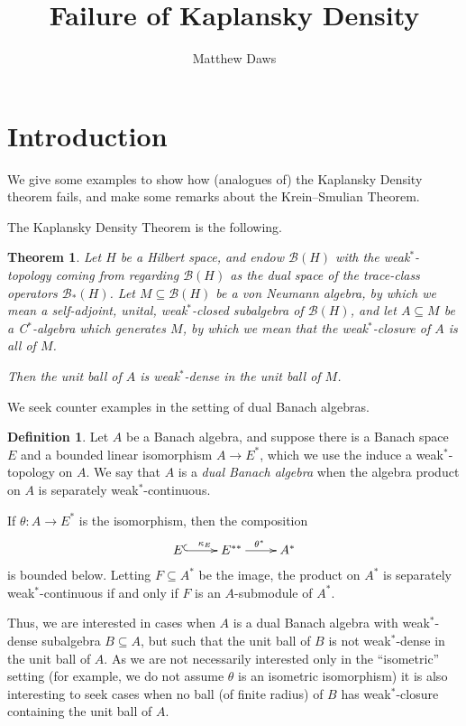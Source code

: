 \documentclass[a4paper,12pt]{article}
\theoremstyle{plain}
\newtheorem{theorem}[proposition]{Theorem}
\theoremstyle{definition}
\newtheorem{definition}[proposition]{Definition}
\newcommand{\mc}{\mathcal}
\begin{document}
\title{Failure of Kaplansky Density}
\author{Matthew Daws}
\maketitle

\section{Introduction}

We give some examples to show how (analogues of) the Kaplansky Density theorem fails,
and make some remarks about the Krein--Smulian Theorem.

The Kaplansky Density Theorem is the following.

\begin{theorem}
Let $H$ be a Hilbert space, and endow $\mc B(H)$ with the weak$^*$-topology coming
from regarding $\mc B(H)$ as the dual space of the trace-class operators $\mc B_*(H)$.
Let $M\subseteq\mc B(H)$ be a von Neumann algebra, by which we mean a self-adjoint,
unital, weak$^*$-closed subalgebra of $\mc B(H)$, and let $A\subseteq M$ be a
C$^*$-algebra which generates $M$, by which we mean that the weak$^*$-closure of $A$
is all of $M$.

Then the unit ball of $A$ is weak$^*$-dense in the unit ball of $M$.
\end{theorem}

We seek counter examples in the setting of dual Banach algebras.

\begin{definition}
Let $A$ be a Banach algebra, and suppose there is a Banach space $E$ and a bounded linear
isomorphism $A\rightarrow E^*$, which we use the induce a weak$^*$-topology on $A$.  We say
that $A$ is a \emph{dual Banach algebra} when the algebra product on $A$ is separately
weak$^*$-continuous.
\end{definition}

If $\theta:A\rightarrow E^*$ is the isomorphism, then the composition
\[ \xymatrix{ E \ar@{^{(}->}[r]^{\kappa_E} & E^{**} \ar[r]^{\theta^*} & A^* } \]
is bounded below.  Letting $F\subseteq A^*$ be the image, the product on $A^*$ is separately
weak$^*$-continuous if and only if $F$ is an $A$-submodule of $A^*$.

Thus, we are interested in cases when $A$ is a dual Banach algebra with weak$^*$-dense subalgebra
$B\subseteq A$, but such that the unit ball of $B$ is not weak$^*$-dense in the unit ball of $A$.
As we are not necessarily interested only in the ``isometric'' setting (for example, we do not
assume $\theta$ is an isometric isomorphism) it is also interesting to seek cases when no ball
(of finite radius) of $B$ has weak$^*$-closure containing the unit ball of $A$.
\end{document}
